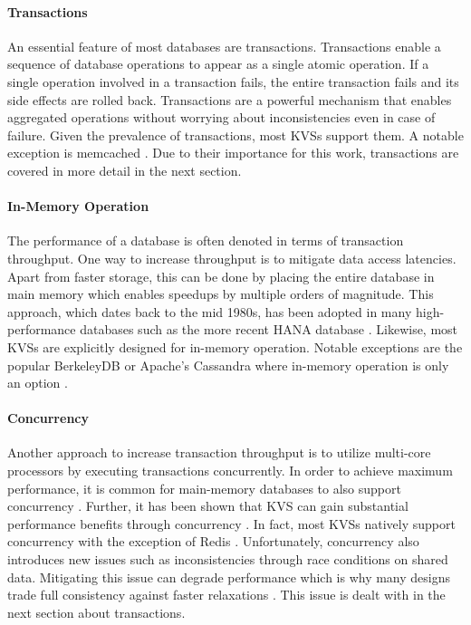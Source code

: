 \paragraph{Transactions}

An essential feature of most databases are transactions. Transactions enable a
sequence of database operations to appear as a single atomic operation. If a
single operation involved in a transaction fails, the entire transaction fails
and its side effects are rolled back. Transactions are a powerful mechanism that enables aggregated operations without
worrying about inconsistencies even in case of failure. Given the prevalence of
transactions, most \acp{KVS} support them. A notable exception is memcached
\cite{wu2016nvmcached}. Due to their importance for this work, transactions are
covered in more detail in the next section.

\paragraph{In-Memory Operation}

The performance of a database is often denoted in terms of transaction
throughput. One way to increase throughput is to mitigate data access latencies.
Apart from faster storage, this can be done by placing the entire database in
main memory which enables speedups by multiple orders of magnitude. This
approach, which dates back to the mid 1980s, has been adopted in many
high-performance databases such as the more recent HANA database
\cite{molina1992main, faerber2012hana}. Likewise, most \acp{KVS} are explicitly
designed for in-memory operation. Notable exceptions are the popular BerkeleyDB
or Apache's Cassandra where in-memory operation is only an option
\cite{bdb2017doc, lakshman2010cassandra}.

\paragraph{Concurrency}

Another approach to increase transaction throughput is to utilize multi-core
processors by executing transactions concurrently. In order to achieve maximum
performance, it is common for main-memory databases to also support concurrency
\cite{grund2010hyrise, faerber2012hana, diaconu2013hekaton}. Further, it has
been shown that \ac{KVS} can gain substantial performance benefits through
concurrency \cite{fan2013memc3, li2015architecting, xu2014building}. In fact,
most \acp{KVS} natively support concurrency with the exception of Redis
\cite{redis2017home}. Unfortunately, concurrency also introduces new issues such
as inconsistencies through race conditions on shared data. Mitigating this issue
can degrade performance which is why many designs trade full consistency against
faster relaxations \cite{decandia2007dynamo}. This issue is dealt with in the
next section about transactions.

